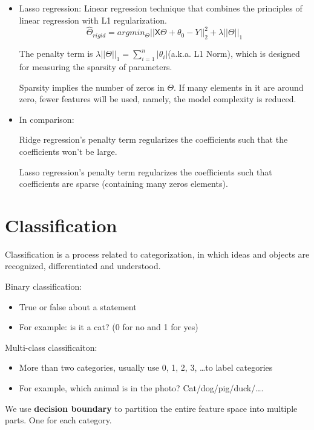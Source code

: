 \documentclass[letterpaper,12pt]{article}
\begin{document}
\begin{itemize}
    \item Lasso regression: Linear regression technique that combines the principles of
          linear regression with L1 regularization.
          \[
              \hat{\Theta}_{rigid}=argmin_\Theta||\mathsf{X}\Theta+\theta_0-Y||_2^2 + \lambda||\Theta||_1
          \]

          The penalty term is $\lambda||\Theta||_1=\sum_{i=1}^{n}|\theta_i| $(a.k.a. L1
          Norm), which is designed for measuring the sparsity of parameters.

          Sparsity implies the number of zeros in $\Theta$. If many elements in it are
          around zero, fewer features will be used, namely, the model complexity is
          reduced.

    \item In comparison:

          Ridge regression's penalty term regularizes the coefficients such that the
          coefficients won't be large.

          Lasso regression's penalty term regularizes the coefficients such that
          coefficients are sparse (containing many zeros elements).
\end{itemize}

\section{Classification}

Classification is a process related to categorization, in which ideas and
objects are recognized, differentiated and understood.

Binary classification:
\begin{itemize}
    \item True or false about a statement
    \item For example: is it a cat? (0 for no and 1 for yes)
\end{itemize}

Multi-class classificaiton:
\begin{itemize}
    \item More than two categories, usually use 0, 1, 2, 3, \ldots to label categories
    \item For example, which animal is in the photo? Cat/dog/pig/duck/\ldots.
\end{itemize}

We use \textbf{decision boundary} to partition the entire feature space into
multiple parts. One for each category.
\end{document}
